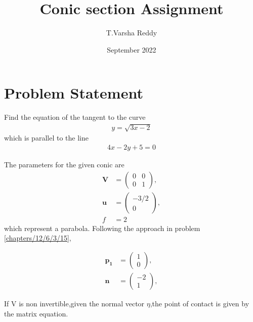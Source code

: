 \documentclass[journal,10pt,twocolumn]{article}
\title{\textbf{Conic section Assignment}}
\author{T.Varsha Reddy}
\date{September 2022}
\let\vec\mathbf
\newcommand{\myvec}[1]{\ensuremath{\begin{pmatrix}#1\end{pmatrix}}}
\begin{document}
\maketitle
\section{Problem Statement}
\fi
Find the equation of the tangent to the curve 
\begin{align}
	y = \sqrt{3x-2}
\end{align}
which is parallel to the line
\begin{align}
	4x-2y+5 = 0
\end{align}
\solution 

The parameters for the given conic are
\begin{align}
	\label{12/6/3/25eq:V_matrix}
	\vec{V} &= \myvec{0 & 0\\0 & 1},
	\\
	\label{12/6/3/25eq:u_vector}
	\vec{u} &= \myvec{-3/2\\0},
	\\
	\label{12/6/3/25eq:f_value}
	f &= 2
\end{align}
which represent a parabola. 
Following the approach in problem 
\ref{chapters/12/6/3/15},

   \begin{align}
     \vec{p_1} &= \myvec{1\\0},
     \\
     \vec{n} &= \myvec{-2\\1},
    \end{align}
    \iffalse
   
If V is non invertible,given the normal vector $\eta$,the point of contact is given by the matrix equation. 
\end{document}
